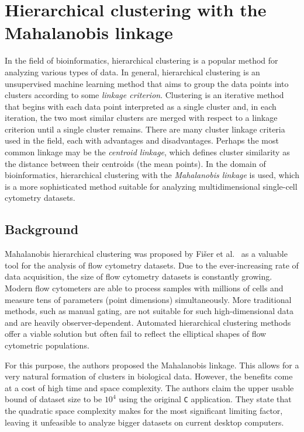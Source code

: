 \section{Hierarchical clustering with the Mahalanobis linkage}
\label{sec:maha}

In the field of bioinformatics, hierarchical clustering is a popular method for analyzing various types of data.
In general, hierarchical clustering is an unsupervised machine learning method that aims to group the data points into clusters according to some \emph{linkage criterion}.
Clustering is an iterative method that begins with each data point interpreted as a single cluster and, in each iteration, the two most similar clusters are merged with respect to a linkage criterion until a single cluster remains.
There are many cluster linkage criteria used in the field, each with advantages and disadvantages.
Perhaps the most common linkage may be the \emph{centroid linkage}, which defines cluster similarity as the distance between their centroids (the mean points). In the domain of bioinformatics, hierarchical clustering with the \emph{Mahalanobis linkage} is used, which is a more sophisticated method suitable for analyzing multidimensional single-cell cytometry datasets.

\subsection{Background}

Mahalanobis hierarchical clustering was proposed by Fišer et al.~\cite{fivser2012detection} as a valuable tool for the analysis of flow cytometry datasets. Due to the ever-increasing rate of data acquisition, the size of flow cytometry datasets is constantly growing. Modern flow cytometers are able to process samples with millions of cells and measure tens of parameters (point dimensions) simultaneously. More traditional methods, such as manual gating, are not suitable for such high-dimensional data and are heavily observer-dependent. Automated hierarchical clustering methods offer a viable solution but often fail to reflect the elliptical shapes of flow cytometric populations.

For this purpose, the authors proposed the Mahalanobis linkage. This allows for a very natural formation of clusters in biological data. However, the benefits come at a cost of high time and space complexity. The authors claim the upper usable bound of dataset size to be $10^4$ using the original \texttt{C} application. They state that the quadratic space complexity makes for the most significant limiting factor, leaving it unfeasible to analyze bigger datasets on current desktop computers.

